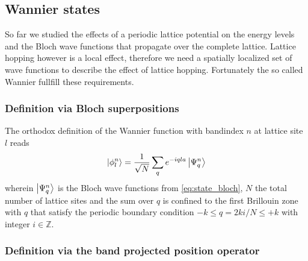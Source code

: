 \subsection{Wannier states}

So far we studied the effects of a periodic lattice potential on the energy
levels and the Bloch wave functions that propagate over the complete lattice.
Lattice hopping however is a local effect, therefore we need a spatially
localized set of wave functions to describe the effect of lattice hopping.
Fortunately the so called Wannier fullfill these requirements.

\subsubsection{Definition via Bloch superpositions}

The orthodox definition of the Wannier function with bandindex $n$ at lattice
site $l$ reads
\begin{equation}
  \ket{\phi^n_{l}}
  =\frac{1}{\sqrt{N}}\sum_qe^{-iqla}\ket{\Psi^n_{q}}
  \label{eq:state_wannier_orthodox}
\end{equation}
wherein $\ket{\Psi^n_q}$ is the Bloch wave functions from
\cref{eq:state_bloch}, $N$ the total number of lattice sites and the sum
over $q$ is confined to the first Brillouin zone with $q$ that satisfy the
periodic boundary condition $-k\leq q=2ki/N\leq+k$ with integer
$i\in\mathbb{Z}$.

\subsubsection{Definition via the band projected position operator}

